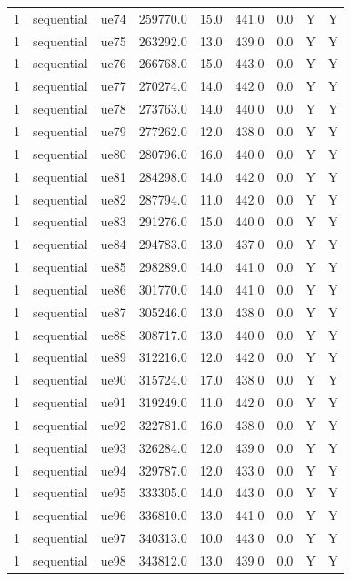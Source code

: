 \begin{table}[ht]
\begin{tabular}{|c|c|c|c|c|c|c|c|c|}
1 & sequential & ue74 & 259770.0 & 15.0 & 441.0 & 0.0 & Y & Y \\
1 & sequential & ue75 & 263292.0 & 13.0 & 439.0 & 0.0 & Y & Y \\
1 & sequential & ue76 & 266768.0 & 15.0 & 443.0 & 0.0 & Y & Y \\
1 & sequential & ue77 & 270274.0 & 14.0 & 442.0 & 0.0 & Y & Y \\
1 & sequential & ue78 & 273763.0 & 14.0 & 440.0 & 0.0 & Y & Y \\
1 & sequential & ue79 & 277262.0 & 12.0 & 438.0 & 0.0 & Y & Y \\
1 & sequential & ue80 & 280796.0 & 16.0 & 440.0 & 0.0 & Y & Y \\
1 & sequential & ue81 & 284298.0 & 14.0 & 442.0 & 0.0 & Y & Y \\
1 & sequential & ue82 & 287794.0 & 11.0 & 442.0 & 0.0 & Y & Y \\
1 & sequential & ue83 & 291276.0 & 15.0 & 440.0 & 0.0 & Y & Y \\
1 & sequential & ue84 & 294783.0 & 13.0 & 437.0 & 0.0 & Y & Y \\
1 & sequential & ue85 & 298289.0 & 14.0 & 441.0 & 0.0 & Y & Y \\
1 & sequential & ue86 & 301770.0 & 14.0 & 441.0 & 0.0 & Y & Y \\
1 & sequential & ue87 & 305246.0 & 13.0 & 438.0 & 0.0 & Y & Y \\
1 & sequential & ue88 & 308717.0 & 13.0 & 440.0 & 0.0 & Y & Y \\
1 & sequential & ue89 & 312216.0 & 12.0 & 442.0 & 0.0 & Y & Y \\
1 & sequential & ue90 & 315724.0 & 17.0 & 438.0 & 0.0 & Y & Y \\
1 & sequential & ue91 & 319249.0 & 11.0 & 442.0 & 0.0 & Y & Y \\
1 & sequential & ue92 & 322781.0 & 16.0 & 438.0 & 0.0 & Y & Y \\
1 & sequential & ue93 & 326284.0 & 12.0 & 439.0 & 0.0 & Y & Y \\
1 & sequential & ue94 & 329787.0 & 12.0 & 433.0 & 0.0 & Y & Y \\
1 & sequential & ue95 & 333305.0 & 14.0 & 443.0 & 0.0 & Y & Y \\
1 & sequential & ue96 & 336810.0 & 13.0 & 441.0 & 0.0 & Y & Y \\
1 & sequential & ue97 & 340313.0 & 10.0 & 443.0 & 0.0 & Y & Y \\
1 & sequential & ue98 & 343812.0 & 13.0 & 439.0 & 0.0 & Y & Y \\

\end{tabular}
\end{table}
